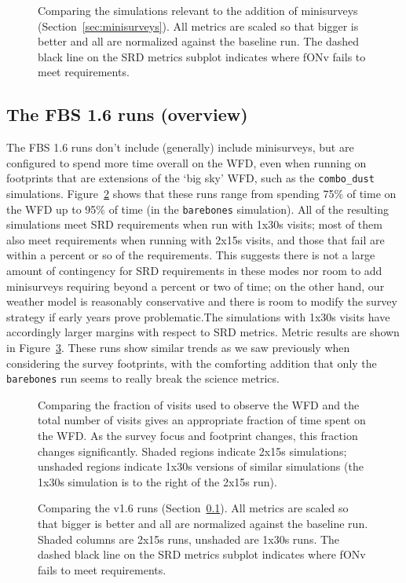 \begin{figure}
\caption{Comparing the simulations relevant to the addition of minisurveys (Section~\ref{sec:minisurveys}). All metrics are scaled so that bigger is better and all are normalized against the baseline run. The dashed black line on the SRD metrics subplot indicates where fONv fails to meet requirements.}
\label{fig:minisurveys}
\end{figure}

\subsection{The FBS 1.6 runs (overview)}\label{sec:runsv16}

The FBS 1.6 runs don't include (generally) include minisurveys, but are configured to spend more time overall on the WFD, even when running on footprints that are extensions of the `big sky' WFD, such as the {\tt combo\_dust} simulations. Figure~\ref{fig:v16_wfdfraction} shows that these runs range from spending 75\% of time on the WFD up to 95\% of time (in the {\tt barebones} simulation). All of the resulting simulations meet SRD requirements when run with 1x30s visits; most of them also meet requirements when running with 2x15s visits, and those that fail are within a percent or so of the requirements. This suggests there is not a large amount of contingency for SRD requirements in these modes nor room to add minisurveys requiring beyond a percent or two of time; on the other hand, our weather model is reasonably conservative and there is room to modify the survey strategy if early years prove problematic.The simulations with 1x30s visits have accordingly larger margins with respect to SRD metrics. Metric results are shown in Figure~\ref{fig:v16}. These runs show similar trends as we saw previously when considering the survey footprints, with the comforting addition that only the {\tt barebones} run seems to really break the science metrics.

\begin{figure}
\caption{Comparing the fraction of visits used to observe the WFD and the total number of visits gives an appropriate fraction of time spent on the WFD. As the survey focus and footprint changes, this fraction changes significantly. Shaded regions indicate 2x15s simulations; unshaded regions indicate 1x30s versions of similar simulations (the 1x30s simulation is to the right of the 2x15s run).}
\label{fig:v16_wfdfraction}
\end{figure}

\begin{figure}
\caption{Comparing the v1.6 runs (Section~\ref{sec:runsv16}). All metrics are scaled so that bigger is better and all are normalized against the baseline run. Shaded columns are 2x15s runs, unshaded are 1x30s runs. The dashed black line on the SRD metrics subplot indicates where fONv fails to meet requirements.}
\label{fig:v16}
\end{figure}

